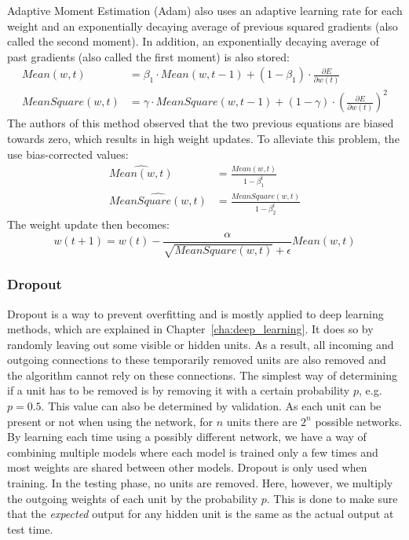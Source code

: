 Adaptive Moment Estimation (Adam) \parencite{DBLP:journals/corr/KingmaB14} also uses an adaptive learning rate for each weight and an exponentially decaying average of previous squared gradients (also called the second moment). In addition, an exponentially decaying average of past gradients (also called the first moment) is also stored:
\begin{subequations}
\label{eq:adam:means}
\begin{align}
    Mean(w,t) &= \beta_1 \cdot Mean(w,t-1) + (1-\beta_1)\cdot \frac{\partial E}{\partial w(t)}\\
    MeanSquare(w, t) &= \gamma \cdot MeanSquare(w, t-1) + (1 - \gamma) \cdot \left (\frac{\partial E}{\partial w(t)} \right )^2
\end{align}
\end{subequations}
The authors of this method observed that the two previous equations are biased towards zero, which results in high weight updates. To alleviate this problem, the use bias-corrected values:
\begin{subequations}
\label{eq:adam:means:corrected}
\begin{align}
    \widehat{Mean(w,t)} &= \frac{Mean(w,t)}{1-\beta_1^t}\\
    \widehat{MeanSquare(w,t)} &= \frac{MeanSquare(w,t)}{1-\beta_2^t}
\end{align}
\end{subequations}
The weight update then becomes:
\begin{equation}
    w(t+1) = w(t) - \frac{\alpha}{\sqrt{MeanSquare(w,t)} + \epsilon} Mean(w,t)
\end{equation}

\subsubsection{Dropout} %
\label{ssub:dropout}
Dropout \parencite{Srivastava2014Dropout} is a way to prevent overfitting and is mostly applied to deep learning methods, which are explained in Chapter~\ref{cha:deep_learning}.
It does so by randomly leaving out some visible or hidden units.
As a result, all incoming and outgoing connections to these temporarily removed units are also removed and the algorithm cannot rely on these connections.
The simplest way of determining if a unit has to be removed is by removing it with a certain probability $p$, e.g.\ $p=0.5$.
This value can also be determined by validation.
As each unit can be present or not when using the network, for $n$ units there are $2^n$ possible networks.
By learning each time using a possibly different network, we have a way of combining multiple models where each model is trained only a few times and most weights are shared between other models.
Dropout is only used when training.
In the testing phase, no units are removed.
Here, however, we multiply the outgoing weights of each unit by the probability $p$.
This is done to make sure that the \textit{expected} output for any hidden unit is the same as the actual output at test time.


